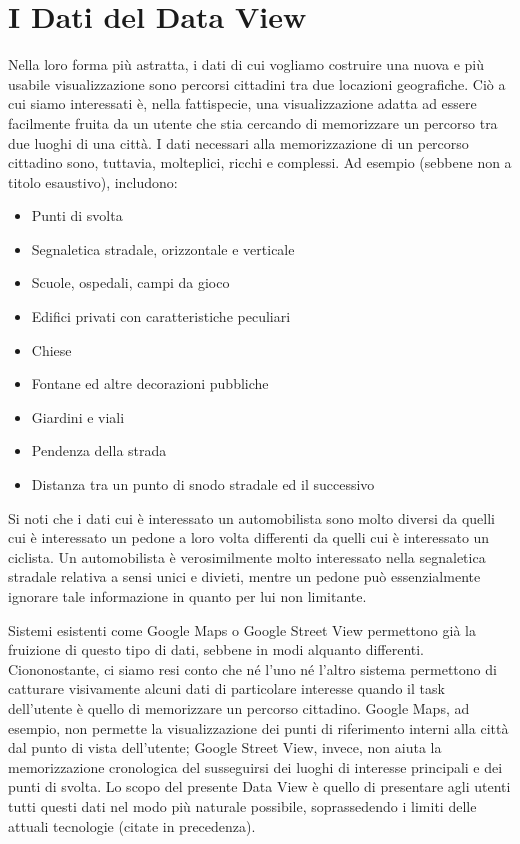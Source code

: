 \documentclass[12pt,a4paper,openright, notitlepage]{report}
\begin{document}
\section{I Dati del Data View}

Nella loro forma più astratta, i dati di cui vogliamo costruire una nuova e più usabile visualizzazione sono percorsi cittadini tra due locazioni geografiche. Ciò a cui siamo interessati è, nella fattispecie, una visualizzazione adatta ad essere facilmente fruita da un utente che stia cercando di memorizzare un percorso tra due luoghi di una città. I dati necessari alla memorizzazione di un percorso cittadino sono, tuttavia, molteplici, ricchi e complessi. Ad esempio (sebbene non a titolo esaustivo), includono:

\begin{itemize}
\item Punti di svolta
\item Segnaletica stradale, orizzontale e verticale
\item Scuole, ospedali, campi da gioco
\item Edifici privati con caratteristiche peculiari
\item Chiese
\item Fontane ed altre decorazioni pubbliche
\item Giardini e viali
\item Pendenza della strada
\item Distanza tra un punto di snodo stradale ed il successivo
\end{itemize}

Si noti che i dati cui è interessato un automobilista sono molto diversi da quelli cui è interessato un pedone a loro volta differenti da quelli cui è interessato un ciclista. Un automobilista è verosimilmente molto interessato nella segnaletica stradale relativa a sensi unici e divieti, mentre un pedone può essenzialmente ignorare tale informazione in quanto per lui non limitante.

Sistemi esistenti come Google Maps o Google Street View permettono già la fruizione di questo tipo di dati, sebbene in modi alquanto differenti. Ciononostante, ci siamo resi conto che né l’uno né l’altro sistema permettono di catturare visivamente alcuni dati di particolare interesse quando il task dell’utente è quello di memorizzare un percorso cittadino. Google Maps, ad esempio, non permette la visualizzazione dei punti di riferimento interni alla città dal punto di vista dell’utente; Google Street View, invece, non aiuta la memorizzazione cronologica del susseguirsi dei luoghi di interesse principali e dei punti di svolta. Lo scopo del presente Data View è quello di presentare agli utenti tutti questi dati nel modo più naturale possibile, soprassedendo i limiti delle attuali tecnologie (citate in precedenza).
\end{document}
